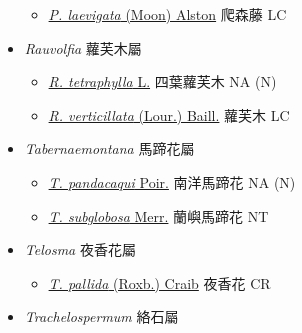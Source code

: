 \begin{itemize}
  \begin{itemize}
        \item[] \href{http://www.theplantlist.org/tpl1.1/search?q=Parsonia+laevigata}{\textit{P. laevigata} (Moon) Alston}   爬森藤   LC
  \end{itemize}
 \item[] \textit{Rauvolfia} 蘿芙木屬
                                
  \begin{itemize}
        \item[] \href{http://www.theplantlist.org/tpl1.1/search?q=Rauvolfia+tetraphylla}{\textit{R. tetraphylla} L.}   四葉蘿芙木   NA (N)
        \item[] \href{http://www.theplantlist.org/tpl1.1/search?q=Rauvolfia+verticillata}{\textit{R. verticillata} (Lour.) Baill.}   蘿芙木   LC
  \end{itemize}
 \item[] \textit{Tabernaemontana} 馬蹄花屬
                                
  \begin{itemize}
        \item[] \href{http://www.theplantlist.org/tpl1.1/search?q=Tabernaemontana+pandacaqui}{\textit{T. pandacaqui} Poir.}   南洋馬蹄花   NA (N)
        \item[] \href{http://www.theplantlist.org/tpl1.1/search?q=Tabernaemontana+subglobosa}{\textit{T. subglobosa} Merr.}   蘭嶼馬蹄花   NT
  \end{itemize}
 \item[] \textit{Telosma} 夜香花屬
                                
  \begin{itemize}
        \item[] \href{http://www.theplantlist.org/tpl1.1/search?q=Telosma+pallida}{\textit{T. pallida} (Roxb.) Craib}   夜香花   CR
  \end{itemize}
 \item[] \textit{Trachelospermum} 絡石屬
                                

\end{itemize}
